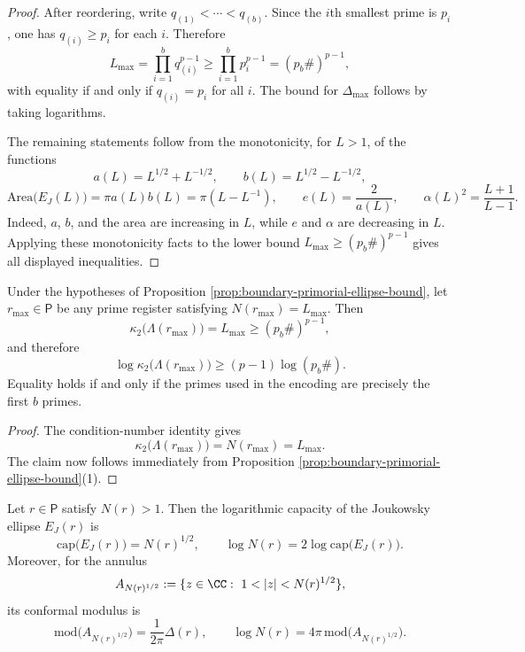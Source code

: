 \begin{proof}
After reordering, write \(q_{(1)}<\cdots<q_{(b)}\). Since the \(i\)th smallest prime is \(p_i\), one has \(q_{(i)}\ge p_i\) for each \(i\). Therefore
\[
L_{\max}
=\prod_{i=1}^{b}q_{(i)}^{p-1}
\ge
\prod_{i=1}^{b}p_i^{p-1}
=(p_b\#)^{p-1},
\]
with equality if and only if \(q_{(i)}=p_i\) for all \(i\). The bound for \(\Delta_{\max}\) follows by taking logarithms.

The remaining statements follow from the monotonicity, for \(L>1\), of the functions
\[
a(L)=L^{1/2}+L^{-1/2},
\qquad
b(L)=L^{1/2}-L^{-1/2},
\]
\[
\mathrm{Area}\bigl(E_J(L)\bigr)=\pi a(L)b(L)=\pi(L-L^{-1}),
\qquad
e(L)=\frac{2}{a(L)},
\qquad
\alpha(L)^2=\frac{L+1}{L-1}.
\]
Indeed, \(a\), \(b\), and the area are increasing in \(L\), while \(e\) and \(\alpha\) are decreasing in \(L\). Applying these monotonicity facts to the lower bound \(L_{\max}\ge (p_b\#)^{p-1}\) gives all displayed inequalities.
\end{proof}

\begin{corollary}\label{cor:dyadic-boundary-godel-ellipse-illconditioning}
Under the hypotheses of Proposition \ref{prop:boundary-primorial-ellipse-bound}, let \(r_{\max}\in\mathsf P\) be any prime register satisfying \(N(r_{\max})=L_{\max}\). Then
\[
\kappa_2\bigl(\Lambda(r_{\max})\bigr)=L_{\max}\ge (p_b\#)^{p-1},
\]
and therefore
\[
\log\kappa_2\bigl(\Lambda(r_{\max})\bigr)\ge (p-1)\log(p_b\#).
\]
Equality holds if and only if the primes used in the encoding are precisely the first \(b\) primes.
\end{corollary}

\begin{proof}
The condition-number identity gives
\[
\kappa_2\bigl(\Lambda(r_{\max})\bigr)=N(r_{\max})=L_{\max}.
\]
The claim now follows immediately from Proposition \ref{prop:boundary-primorial-ellipse-bound}(1).
\end{proof}

\begin{corollary}\label{cor:capacity-modulus-koenigs}
Let \(r\in\mathsf P\) satisfy \(N(r)>1\). Then the logarithmic capacity of the Joukowsky ellipse \(E_J(r)\) is
\[
\mathrm{cap}\bigl(E_J(r)\bigr)=N(r)^{1/2},
\qquad
\log N(r)=2\log\mathrm{cap}\bigl(E_J(r)\bigr).
\]
Moreover, for the annulus
\[
A_{N(r)^{1/2}}:=\{z\in\CC:\ 1<|z|<N(r)^{1/2}\},
\]
its conformal modulus is
\[
\mathrm{mod}\bigl(A_{N(r)^{1/2}}\bigr)
=\frac{1}{2\pi}\Delta(r),
\qquad
\log N(r)=4\pi\,\mathrm{mod}\bigl(A_{N(r)^{1/2}}\bigr).
\]
\end{corollary}

